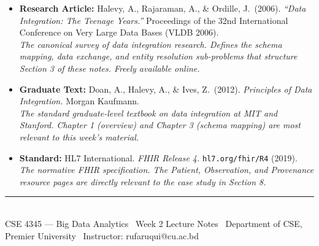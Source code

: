 \documentclass[12pt,a4paper]{article}
\begin{document}
\begin{itemize}[leftmargin=2em, itemsep=6pt]
  \item \textbf{Research Article:} Halevy, A., Rajaraman, A., \& Ordille, J.\ (2006). \textit{``Data Integration: The Teenage Years.''} Proceedings of the 32nd International Conference on Very Large Data Bases (VLDB 2006).\\
        \small\textit{The canonical survey of data integration research.  Defines the schema mapping, data exchange, and entity resolution sub-problems that structure Section 3 of these notes.  Freely available online.}

  \item \textbf{Graduate Text:} Doan, A., Halevy, A., \& Ives, Z.\ (2012). \textit{Principles of Data Integration.} Morgan Kaufmann.\\
        \small\textit{The standard graduate-level textbook on data integration at MIT and Stanford.  Chapter 1 (overview) and Chapter 3 (schema mapping) are most relevant to this week's material.}

  \item \textbf{Standard:} HL7 International. \textit{FHIR Release 4.} \texttt{hl7.org/fhir/R4} (2019).\\
        \small\textit{The normative FHIR specification.  The Patient, Observation, and Provenance resource pages are directly relevant to the case study in Section 8.}
\end{itemize}

\vspace{12pt}
\noindent\rule{\linewidth}{0.8pt}\\[4pt]
{\small\textcolor{PUGray}{CSE 4345 — Big Data Analytics \textbar\ Week 2 Lecture Notes \textbar\
Department of CSE, Premier University \textbar\ Instructor: rufaruqui@cu.ac.bd}}
\end{document}
